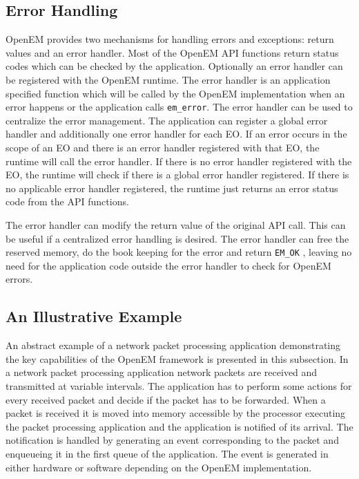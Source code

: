 \subsection{Error Handling}
\label{subsec:error}
OpenEM provides two mechanisms for handling errors and exceptions: return values and an error handler. Most of the OpenEM API functions return status codes which can be checked by the application. \cite{openempage} Optionally an error handler can be registered with the OpenEM runtime. The error handler is an application specified function which will be called by the OpenEM implementation when an error happens or the application calls \texttt{em\_error}. The error handler can be used to centralize the error management. The application can register a global error handler and additionally one error handler for each EO. If an error occurs in the scope of an EO and there is an error handler registered with that EO, the runtime will call the error handler. If there is no error handler registered with the EO, the runtime will check if there is a global error handler registered. If there is no applicable error handler registered, the runtime just returns an error status code from the API functions. \cite{openempage}

The error handler can modify the return value of the original API call. This can be useful if a centralized error handling is desired. The error handler can free the reserved memory, do the book keeping for the error and return \texttt{EM\_OK} , leaving no need for the application code outside the error handler to check for OpenEM errors. \cite{openempage}

\subsection{An Illustrative Example}
\label{subsec:example}
An abstract example of a network packet processing application demonstrating the key capabilities of the OpenEM framework is presented in this subsection. In a network packet processing application network packets are received and transmitted at variable intervals. The application has to perform some actions for every received packet and decide if the packet has to be forwarded. When a packet is received it is moved into memory accessible by the processor executing the packet processing application and the application is notified of its arrival. The notification is handled by generating an event corresponding to the packet and enqueueing it in the first queue of the application. The event is generated in either hardware or software depending on the OpenEM implementation.

